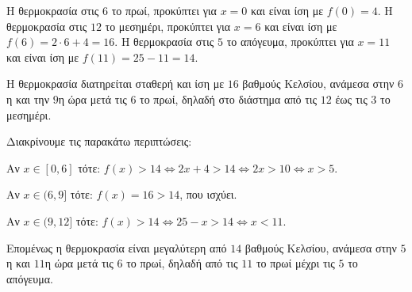 
\begin{alist}
\item Η θερμοκρασία στις $6$ το πρωί, προκύπτει για $x = 0$ και είναι ίση με $f(0) = 4$.
Η θερμοκρασία στις $12$ το μεσημέρι, προκύπτει για $x = 6$ και είναι ίση με $f(6) = 2 \cdot 6 + 4 = 16$.
Η θερμοκρασία στις $5$ το απόγευμα, προκύπτει για $x = 11$ και είναι ίση με $f(11) = 25 - 11 = 14$.

\item 
\begin{rlist}
\item Η θερμοκρασία διατηρείται σταθερή και ίση με $16$ βαθμούς Κελσίου, ανάμεσα στην $6$η
και την $9$η ώρα μετά τις $6$ το πρωί, δηλαδή στο διάστημα από τις $12$ έως τις $3$ το μεσημέρι.

\item Διακρίνουμε τις παρακάτω περιπτώσεις:
\begin{bulletlist}
\item Αν $x \in [0, 6]$ τότε: $f(x) > 14 \Leftrightarrow 2x + 4 > 14 \Leftrightarrow 2x > 10 \Leftrightarrow x > 5$.
\item Αν $x \in (6, 9]$ τότε: $f(x) = 16 > 14$, που ισχύει.
\item Αν $x \in (9, 12]$ τότε: $f(x) > 14 \Leftrightarrow 25 - x > 14 \Leftrightarrow x < 11$.
\end{bulletlist}
Επομένως η θερμοκρασία είναι μεγαλύτερη από $14$ βαθμούς Κελσίου, ανάμεσα στην $5$η και 
$11$η ώρα μετά τις $6$ το πρωί, δηλαδή από τις $11$ το πρωί μέχρι τις $5$ το απόγευμα.
\end{rlist}


\end{alist}
